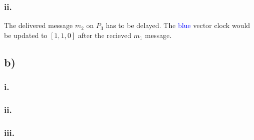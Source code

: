 \documentclass{scrartcl}
\begin{document}
\subsubsection*{ii.}

The delivered message $ m_2 $ on $ P_3 $ has to be delayed. The \textcolor{blue}{blue} vector clock would be updated to $ [1,1,0] $ after the recieved $ m_1 $ message.

\subsection*{b)}
\subsubsection*{i.}
\subsubsection*{ii.}
\subsubsection*{iii.}
\end{document}
